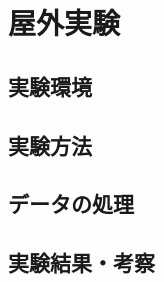 \documentclass[../main]{subfiles}
\begin{document}
\section{屋外実験}
\label{sec:vexp_cone-index}

\subsection{実験環境}
\label{subsec:vexp_ci_environment}

\subsection{実験方法}
\label{subsec:vexp_ci_method}

\subsection{データの処理}
\label{subsec:vexp_ci_processing}

\subsection{実験結果・考察}
\label{subsec:vexp_ci_result}
\end{document}

